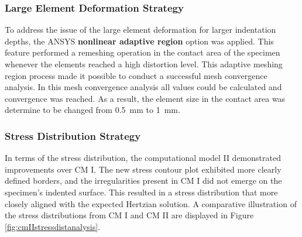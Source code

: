 \subsubsection*{Large Element Deformation Strategy}
To address the issue of the large element deformation for larger indentation depths, the ANSYS \textbf{nonlinear adaptive region}
option was applied. This feature performed a remeshing operation in the contact area of the specimen whenever 
the elements reached a high distortion level. This adaptive meshing region process made it possible to conduct 
a successful mesh convergence analysis. In this mesh convergence analysis all values could be calculated and 
convergence was reached. As a result, the element size in the contact area was determine to be changed from 
\SI{0.5}{\milli\meter} to \SI{1}{\milli\meter}. 

\subsubsection*{Stress Distribution Strategy}
In terms of the stress distribution, the computational model II demonstrated improvements over CM I. The new
stress contour plot exhibited more clearly defined borders, and the irregularities present in CM I did not 
emerge on the specimen's indented surface. This resulted in a stress distribution that more closely aligned
with the expected Hertzian solution. A comparative illustration of the stress distributions from CM I and 
CM II are displayed in Figure \ref{fig:cmIIstressdistanalysis}.\\

